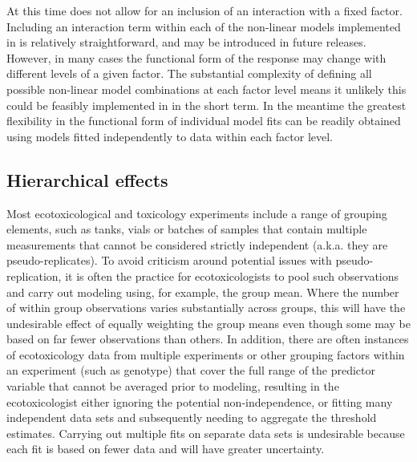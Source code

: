 \documentclass[
  shortnames]{jss}
\begin{document}
At this time  does not allow for an inclusion of an interaction with a fixed factor. Including an interaction term within each of the non-linear models implemented in  is relatively straightforward, and may be introduced in future releases. However, in many cases the functional form of the response may change with different levels of a given factor. The substantial complexity of defining all possible non-linear model combinations at each factor level means it unlikely this could be feasibly implemented in  in the short term. In the meantime the greatest flexibility in the functional form of individual model fits can be readily obtained using models fitted independently to data within each factor level.

\hypertarget{hierarchical-effects}{%
\subsection{Hierarchical effects}\label{hierarchical-effects}}

Most ecotoxicological and toxicology experiments include a range of grouping elements, such as tanks, vials or batches of samples that contain multiple measurements that cannot be considered strictly independent (a.k.a. they are pseudo-replicates). To avoid criticism around potential issues with pseudo-replication, it is often the practice for ecotoxicologists to pool such observations and carry out modeling using, for example, the group mean. Where the number of within group observations varies substantially across groups, this will have the undesirable effect of equally weighting the group means even though some may be based on far fewer observations than others. In addition, there are often instances of ecotoxicology data from multiple experiments or other grouping factors within an experiment (such as genotype) that cover the full range of the predictor variable that cannot be averaged prior to modeling, resulting in the ecotoxicologist either ignoring the potential non-independence, or fitting many independent data sets and subsequently needing to aggregate the threshold estimates. Carrying out multiple fits on separate data sets is undesirable because each fit is based on fewer data and will have greater uncertainty.
\end{document}
